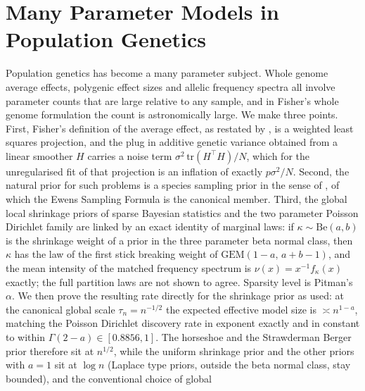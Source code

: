 \DeclareRobustCommand{\PD}{\mathrm{PD}}
\DeclareRobustCommand{\GEM}{\mathrm{GEM}}
\DeclareRobustCommand{\Be}{\mathrm{Be}}
\DeclareRobustCommand{\E}{\mathbb{E}}
\DeclareRobustCommand{\Prob}{\mathbb{P}}
\DeclareRobustCommand{\Var}{\mathrm{Var}}
\DeclareRobustCommand{\Cov}{\mathrm{Cov}}
\DeclareRobustCommand{\R}{\mathbb{R}}
\DeclareRobustCommand{\dd}{\,\mathrm{d}}
\chapter{Many Parameter Models in Population Genetics}\label{ch:mp}
\begin{chaptersummary}
Population genetics has become a many parameter subject. Whole genome average effects,
polygenic effect sizes and allelic frequency spectra all involve parameter counts that are
large relative to any sample, and in Fisher's whole genome formulation the count is
astronomically large. We make three points. First, Fisher's definition of the average
effect, as restated by \citet{mp:ewens2024}, is a weighted least squares projection, and the
plug in additive genetic variance obtained from a linear smoother $H$ carries a noise term
$\sigma^2\,\mathrm{tr}(H^\top H)/N$, which for the unregularised fit of that projection is an inflation of exactly
$p\sigma^2/N$. Second, the natural prior for such problems is a species sampling prior in
the sense of \citet{mp:kingman1975}, of which the Ewens Sampling Formula is the canonical member.
Third, the global local shrinkage priors of sparse Bayesian statistics and the
two parameter Poisson Dirichlet family are linked by an exact identity of marginal laws: if $\kappa\sim\Be(a,b)$ is the
shrinkage weight of a prior in the three parameter beta normal class, then $\kappa$ has the law of the
first stick breaking weight of $\GEM(1-a,\,a+b-1)$, and the mean intensity of the matched frequency spectrum is
$\nu(x)=x^{-1}f_\kappa(x)$ exactly; the full partition laws are not shown to agree. Sparsity level is Pitman's $\alpha$. We then prove the resulting rate directly for the
shrinkage prior as used: at the canonical global scale $\tau_n=n^{-1/2}$ the expected
effective model size is $\asymp n^{1-a}$, matching the Poisson Dirichlet discovery rate in
exponent exactly and in constant to within $\Gamma(2-a)\in[0.8856,1]$. The horseshoe and the
Strawderman Berger prior therefore sit at $n^{1/2}$, while the uniform shrinkage prior and
the other priors with $a=1$ sit at $\log n$ (Laplace type priors, outside the beta normal class, stay bounded), and the conventional choice of global

\end{chaptersummary}
